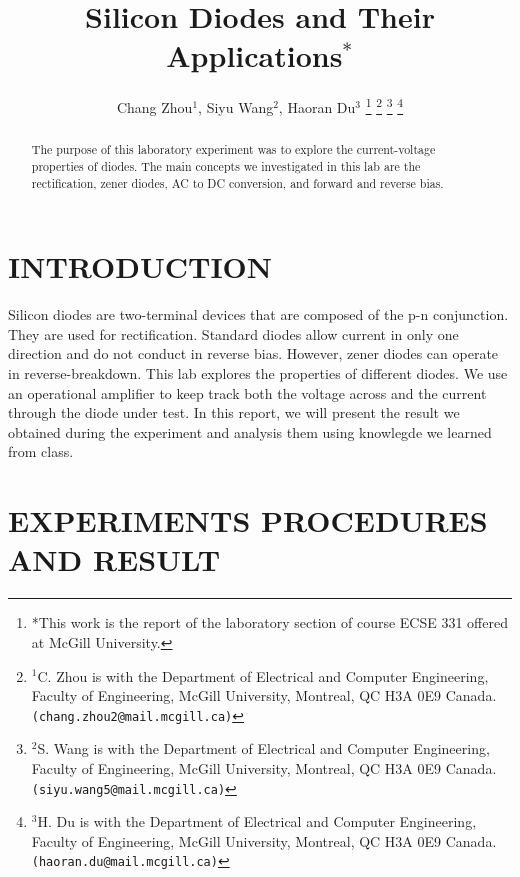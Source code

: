 \documentclass[letterpaper, 10 pt, conference]{ieeeconf}  %
\title{\LARGE \bf Silicon Diodes and Their Applications$^{*}$}
\author{Chang Zhou$^{1}$, Siyu Wang$^{2}$, Haoran Du$^{3}$%
\thanks{*This work is the report of the laboratory section of course ECSE 331 offered at McGill University.}%
\thanks{$^{1}$C. Zhou is with the Department of Electrical and Computer
Engineering, Faculty of Engineering, McGill University, Montreal, QC H3A 0E9 Canada.
{\tt\small (chang.zhou2@mail.mcgill.ca)}}%
\thanks{$^{2}$S. Wang is with the Department of Electrical and Computer
Engineering, Faculty of Engineering, McGill University, Montreal, QC H3A 0E9 Canada.
{\tt\small (siyu.wang5@mail.mcgill.ca)}}%
\thanks{$^{3}$H. Du is with the Department of Electrical and Computer
Engineering, Faculty of Engineering, McGill University, Montreal, QC H3A 0E9 Canada.
{\tt\small (haoran.du@mail.mcgill.ca)}}%
}
\begin{document}
    \maketitle
    \thispagestyle{empty}
    \pagestyle{empty}


    \begin{abstract}
        The purpose of this laboratory experiment was to explore the current-voltage properties of diodes. The main concepts we investigated in this lab are the rectification, zener diodes, AC to DC conversion, and forward and reverse bias.
    \end{abstract}


    \section{INTRODUCTION}
    Silicon diodes are two-terminal devices that are composed of the p-n conjunction. They are used for rectification. Standard diodes allow current in only one direction and do not conduct in reverse bias. However, zener diodes can operate in reverse-breakdown. This lab explores the properties of different diodes. We use an operational amplifier to keep track both the voltage across and the current through the diode under test.\newline
    In this report, we will present the result we obtained during the experiment and analysis them using knowlegde we learned from class.\newline
    \section{EXPERIMENTS PROCEDURES AND RESULT}
\end{document}

